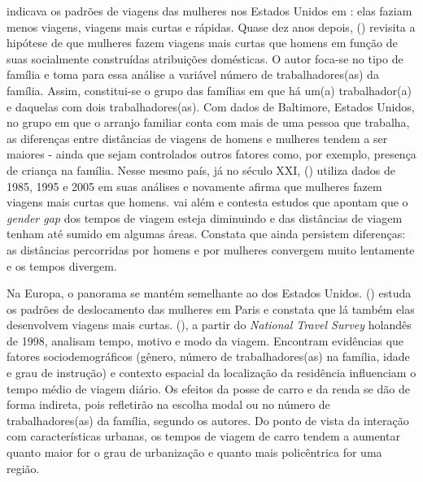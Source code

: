  indicava os padrões de viagens das mulheres nos Estados Unidos em \citeyear{FOX1983}: elas faziam menos viagens, viagens mais curtas e rápidas. Quase dez anos depois,  (\citeyear{IBIPO1992}) revisita a hipótese de que mulheres fazem viagens mais curtas que homens em função de suas socialmente construídas atribuições domésticas. O autor foca-se no tipo de família e toma para essa análise a variável número de trabalhadores(as) da família. Assim, constitui-se o grupo das famílias em que há um(a) trabalhador(a) e daquelas com dois trabalhadores(as). Com dados de Baltimore, Estados Unidos, no grupo em que o arranjo familiar conta com mais de uma pessoa que trabalha, as diferenças entre distâncias de viagens de homens e mulheres tendem a ser maiores - ainda que sejam controlados outros fatores como, por exemplo, presença de criança na família.
Nesse mesmo país, já no século XXI,  (\citeyear{CRANE2007}) utiliza dados de 1985, 1995 e 2005 em suas análises e novamente afirma que mulheres fazem viagens mais curtas que homens.  vai além e contesta estudos que apontam que o \emph{gender gap} dos tempos de viagem esteja diminuindo e das distâncias de viagem tenham até sumido em algumas áreas. Constata que ainda persistem diferenças: as distâncias percorridas por homens e por mulheres convergem muito lentamente e os tempos divergem.

Na Europa, o panorama se mantém semelhante ao dos Estados Unidos.  (\citeyear{FAGNANI1983}) estuda os padrões de deslocamento das mulheres em Paris e constata que lá também elas desenvolvem viagens mais curtas.
 (\citeyear{SCHWANEN2002}), a partir do \emph{National Travel Survey} holandês de 1998, analisam tempo, motivo e modo da viagem. Encontram evidências que fatores sociodemográficos (gênero, número de trabalhadores(as) na família, idade e grau de instrução) e contexto espacial da localização da residência influenciam o tempo médio de viagem diário. Os efeitos da posse de carro e da renda se dão de forma indireta, pois refletirão na escolha modal ou no número de trabalhadores(as) da família, segundo os autores. Do ponto de vista da interação com características urbanas, os tempos de viagem de carro tendem a aumentar quanto maior for o grau de urbanização e quanto mais policêntrica for uma região.


